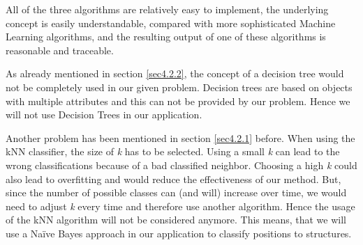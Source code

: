 All of the three algorithms are relatively easy to implement, the underlying concept is easily understandable, compared with more sophisticated Machine Learning algorithms, and the resulting output of one of these algorithms is reasonable and traceable. 

As already mentioned in section \ref{sec4.2.2}, the concept of a decision tree would not be completely used in our given problem. Decision trees are based on objects with multiple attributes and this can not be provided by our problem. Hence we will not use Decision Trees in our application.

Another problem has been mentioned in section \ref{sec4.2.1} before. When using the kNN classifier, the size of \emph{k} has to be selected. Using a small \emph{k} can lead to the wrong classifications because of a bad classified neighbor. Choosing a high \emph{k} could also lead to overfitting and would reduce the effectiveness of our method. But, since the number of possible classes can (and will) increase over time, we would need to adjust \emph{k} every time and therefore use another algorithm. Hence the usage of the kNN algorithm will not be considered anymore.
This means, that we will use a Na{\"i}ve Bayes approach in our application to classify positions to structures. 